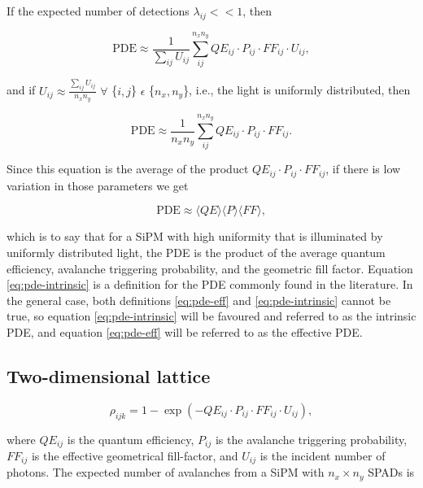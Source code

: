 \documentclass[main.tex]{subfiles} %
\begin{document}
If the expected number of detections $\lambda_{ij} << 1$, then

\begin{equation}\label{eq:nf-dim}
    \text{PDE} \approx \frac{1}{\sum_{ij} U_{ij}}\sum_{ij}^{n_x n_y} QE_{ij} \cdot P_{ij} \cdot FF_{ij} \cdot U_{ij},
\end{equation}

and if $U_{ij} \approx \frac{\sum_{ij} U_{ij}}{n_x n_y}$ $\forall$ \{$i, j$\}  $\epsilon$  \{$n_x, n_y$\}, i.e., the light is uniformly distributed, then

\begin{equation}\label{eq:pde-dim}
    \text{PDE} \approx \frac{1}{n_x n_y}\sum_{ij}^{n_x n_y} QE_{ij} \cdot P_{ij} \cdot FF_{ij}.
\end{equation}

Since this equation is the average of the product $QE_{ij} \cdot P_{ij} \cdot FF_{ij}$, if there is low variation in those parameters we get

\begin{equation}\label{eq:pde-intrinsic}
    \text{PDE} \approx \langle QE \rangle \langle P \rangle \langle FF \rangle,
\end{equation}

which is to say that for a SiPM with high uniformity that is illuminated by uniformly distributed light, the PDE is the product of the average quantum efficiency, avalanche triggering probability, and the geometric fill factor. Equation \ref{eq:pde-intrinsic} is a definition for the PDE commonly found in the literature. In the general case, both definitions \ref{eq:pde-eff} and \ref{eq:pde-intrinsic} cannot be true, so equation \ref{eq:pde-intrinsic} will be favoured and referred to as the intrinsic PDE, and equation \ref{eq:pde-eff} will be referred to as the effective PDE.

\subsection{Two-dimensional lattice}

\begin{equation}
    \rho_{ijk} = 1-\exp{\left(-QE_{ij}\cdot P_{ij}\cdot FF_{ij}\cdot U_{ij}\right)},
\end{equation}

where $QE_{ij}$ is the quantum efficiency, $P_{ij}$ is the avalanche triggering probability, $FF_{ij}$ is the effective geometrical fill-factor, and $U_{ij}$ is the incident number of photons. The expected number of avalanches from a SiPM with $n_x \times n_y$ SPADs is
\end{document}
